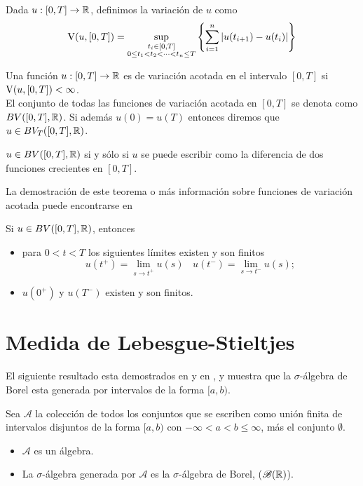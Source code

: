 \begin{defi}
	Dada $u:[0,T]\to \mathbb{R}$, definimos la variación  de $u$ como 
	$$\operatorname{V}(u,[0,T])=\sup_{\substack{ t_i\in [0,T]\\
			0\leq t_1 < t_2< \dots < t_n  \leq T}}\left\lbrace \sum_{i=1}^{n}|u(t_{i+1})-u(t_i)|\right\rbrace $$
\end{defi}
\begin{defi}
	Una función $u:[0,T]\to \mathbb{R}$ es de variación acotada en el intervalo $[0,T]$ si $\operatorname{V}(u,[0,T])<\infty$. \\
	El conjunto de todas las funciones de variación acotada en $[0,T]$ se denota como $BV([0,T],\mathbb{R})$. 
	Si además $u(0)=u(T)$ entonces diremos que $u\in BV_T([0,T],\mathbb{R})$. 
\end{defi}
\begin{thm}\label{T-VB}
	 $u\in BV([0,T],\mathbb{R})$ si y sólo si $u$ se puede escribir como la diferencia de dos funciones crecientes en $[0,T]$.
\end{thm}

La demostración de este teorema o más información sobre funciones de variación acotada puede encontrarse en \cite[Teorema  2.7.2]{Carter} %
\begin{cor}
	Si $u\in BV([0,T],\mathbb{R})$, entonces 
	\begin{itemize}
		\item para $0<t<T$ los siguientes límites existen y son finitos
		$$u(t^+)=\lim\limits_{s\to t^+}u(s) \ \ \ \ u(t^-)=\lim\limits_{s\to t^-}u(s);$$
		\item $u(0^+)$ y $u(T^-)$ existen y son finitos.
	\end{itemize}
\end{cor}






\section{Medida de Lebesgue-Stieltjes}

El siguiente resultado esta demostrados en \cite[Proposición 1.2]{folland} y en \cite[Proposición 1.7]{folland}, y muestra que la $\sigma$-álgebra de Borel esta generada por intervalos de la forma $[a,b)$.

\begin{prop}\label{prop:algebra de borel}Sea $\mathcal{A}$ la colección de todos los conjuntos que se escriben como unión finita de intervalos disjuntos de la forma $[a,b)$ con $-\infty<a<b\leq\infty$, más el conjunto $\emptyset$.
	\begin{itemize}
		\item $\mathcal{A}$ es un álgebra.
		\item La $\sigma$-álgebra generada por $\mathcal{A}$ es la $\sigma$-álgebra de Borel, ($\mathscr{B}(\mathbb{R})$).
	\end{itemize}
\end{prop}

